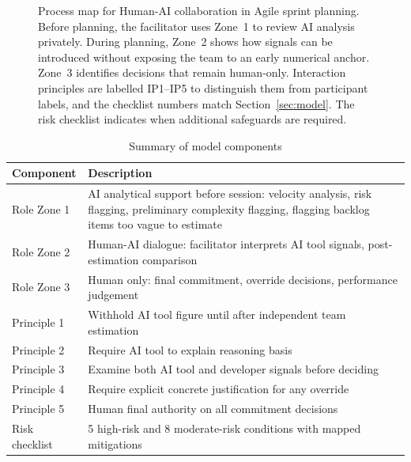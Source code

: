 \documentclass[a4paper,twoside]{bth}
\begin{document}
\begin{figure}[p]
\caption[Process map for Human-AI collaboration in Agile sprint planning]{Process map for Human-AI collaboration in Agile sprint planning. Before planning, the facilitator uses Zone~1 to review AI analysis privately. During planning, Zone~2 shows how signals can be introduced without exposing the team to an early numerical anchor. Zone~3 identifies decisions that remain human-only. Interaction principles are labelled IP1--IP5 to distinguish them from participant labels, and the checklist numbers match Section~\ref{sec:model}. The risk checklist indicates when additional safeguards are required.}
\label{fig:model}
\end{figure}

\begin{table}[htb]
\caption{Summary of model components}
\label{tab:model}
\centering
\begin{tabular}{p{3cm} p{9.5cm}}
\toprule
Component & Description \\
\midrule
Role Zone 1 & AI analytical support before session: velocity analysis, risk flagging, preliminary complexity flagging, flagging backlog items too vague to estimate \\
Role Zone 2 & Human-AI dialogue: facilitator interprets AI tool signals, post-estimation comparison \\
Role Zone 3 & Human only: final commitment, override decisions, performance judgement \\
\midrule
Principle 1 & Withhold AI tool figure until after independent team estimation \\
Principle 2 & Require AI tool to explain reasoning basis \\
Principle 3 & Examine both AI tool and developer signals before deciding \\
Principle 4 & Require explicit concrete justification for any override \\
Principle 5 & Human final authority on all commitment decisions \\
\midrule
Risk checklist & 5 high-risk and 8 moderate-risk conditions with mapped mitigations \\
\bottomrule
\end{tabular}
\end{table}
\end{document}
